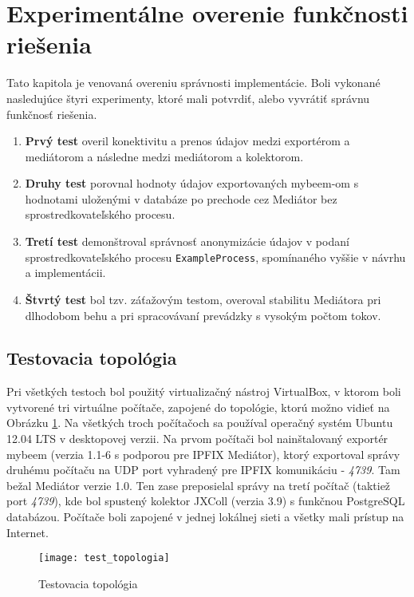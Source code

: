 \section{Experimentálne overenie funkčnosti riešenia}

Tato kapitola je venovaná overeniu správnosti implementácie. Boli vykonané nasledujúce štyri experimenty, 
ktoré mali potvrdiť, alebo vyvrátiť správnu funkčnosť riešenia. 
\begin{enumerate}
 \item \textbf{Prvý test} overil konektivitu a prenos údajov medzi exportérom a mediátorom a následne medzi 
 mediátorom a kolektorom.
 \item \textbf{Druhy test} porovnal hodnoty údajov exportovaných mybeem-om s hodnotami uloženými v databáze po prechode
 cez Mediátor bez sprostredkovateľského procesu.
 \item \textbf{Tretí test} demonštroval správnosť anonymizácie údajov v podaní sprostredkovateľského procesu 
 \verb|ExampleProcess|, spomínaného vyššie v návrhu a implementácii.
 \item \textbf{Štvrtý test} bol tzv. záťažovým testom, overoval stabilitu Mediátora pri dlhodobom behu a 
 pri spracovávaní prevádzky s vysokým počtom tokov.
\end{enumerate}


\subsection{Testovacia topológia}

Pri všetkých testoch bol použitý virtualizačný nástroj VirtualBox, v ktorom boli vytvorené tri virtuálne 
počítače, zapojené do topológie, ktorú možno vidieť na Obrázku \ref{o:test_topologia}.
Na všetkých troch počítačoch sa používal operačný systém Ubuntu 12.04 LTS v desktopovej verzii. Na prvom 
počítači bol nainštalovaný exportér mybeem (verzia 1.1-6 s podporou pre IPFIX Mediátor), ktorý exportoval 
správy druhému počítaču na UDP port vyhradený pre IPFIX komunikáciu - \emph{4739}. Tam bežal Mediátor
verzie 1.0. Ten zase preposielal správy na tretí počítač (taktiež port \emph{4739}), kde bol spustený 
kolektor JXColl (verzia 3.9) s funkčnou PostgreSQL databázou. Počítače boli zapojené v jednej lokálnej 
sieti a všetky mali prístup na Internet.

\begin{figure}[ht!]
\centering
\texttt{[image: test\_topologia]}
\caption{Testovacia topológia}\label{o:test_topologia}
\end{figure}

